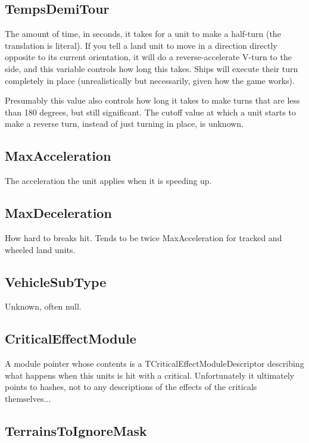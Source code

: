 \documentclass{article}
\begin{document}
\subsection{TempsDemiTour}

The amount of time, in seconds, it takes for a unit to make a half-turn (the translation is literal). If you tell a land unit to move in a direction directly opposite to its current orientation, it will do a reverse-accelerate V-turn to the side, and this variable controls how long this takes. Ships will execute their turn completely in place (unrealistically but necessarily, given how the game works).

Presumably this value also controls how long it takes to make turns that are less than 180 degrees, but still significant. The cutoff value at which a unit starts to make a reverse turn, instead of just turning in place, is unknown.

\subsection{MaxAcceleration}

The acceleration the unit applies when it is speeding up.

\subsection{MaxDeceleration}

How hard to breaks hit. Tends to be twice MaxAcceleration for tracked and wheeled land units.

\subsection{VehicleSubType}

Unknown, often null.

\subsection{CriticalEffectModule}

A module pointer whose contents is a TCriticalEffectModuleDescriptor describing what happens when this units is hit with a critical. Unfortunately it ultimately points to hashes, not to any descriptions of the effects of the criticals themselves...

\subsection{TerrainsToIgnoreMask}
\end{document}
